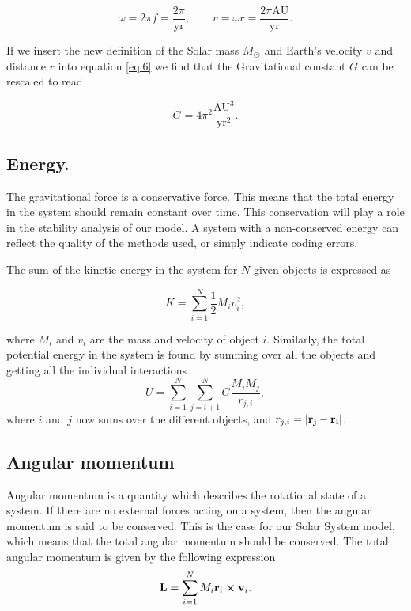 \documentclass[a4paper, 10pt, reqno]{amsart}
\begin{document}
\begin{equation}\label{eq:7}
    \omega = 2 \pi f = \frac{2 \pi}{\text{yr}}, \qquad v = \omega r = \frac{2 \pi \text{AU}}{\text{yr}}.
\end{equation}

\noindent If we insert the new definition of the Solar mass $M_\Sun$ and Earth's velocity $v$ and distance $r$ into equation \eqref{eq:6} we find that the Gravitational constant $G$ can be rescaled to read

\begin{equation}\label{eq:8}
    G = 4 \pi^2  \frac{\text{AU}^3 }{\text{yr}^2}.
\end{equation}

\subsection{Energy.}\label{subsec:energy} The gravitational force is a conservative force. This means that the total energy in the system should remain constant over time. This conservation will play a role in the stability analysis of our model. A system with a non-conserved energy can reflect the quality of the methods used, or simply indicate coding errors.

The sum of the kinetic energy in the system for $N$ given objects is expressed as

\begin{equation}\label{eq:9}
    K = \sum_{i=1}^N \frac{1}{2} M_i v_i^2,
\end{equation}

\noindent where $M_i$ and $v_i$ are the mass and velocity of object $i$. Similarly, the total potential energy in the system is found by summing over all the objects and getting all the individual interactions
\begin{equation}\label{eq:10}
    U = \sum_{i = 1}^N \sum_{j = i+1}^N G\frac{M_i M_j}{r_{j,i}},
\end{equation}
where $i$ and $j$ now sums over the different objects, and $r_{j,i} = \abs{\mathbf{r_j} - \mathbf{r_i}}$.


\subsection{Angular momentum}\label{subsec:angmom} Angular momentum is a quantity which describes the rotational state of a system. If there are no external forces acting on a system, then the angular momentum is said to be conserved. This is the case for our Solar System model, which means that the total angular momentum should be conserved. The total angular momentum is given by the following expression
\begin{equation*}
    \mathbf{L} = \sum_{i=1}^N M_i \mathbf{r}_i \cross \mathbf{v}_i. 
\end{equation*}
\end{document}
